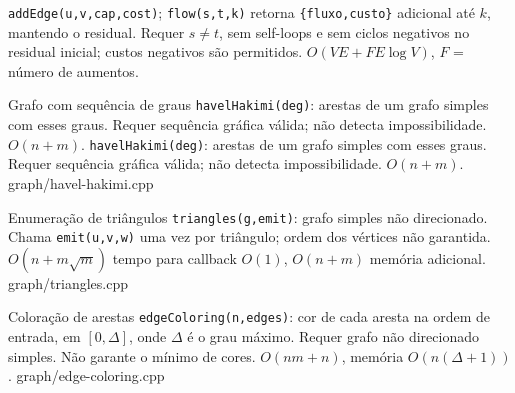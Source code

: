 {\texttt{addEdge(u,v,cap,cost)}; \texttt{flow(s,t,k)} retorna \texttt{\{fluxo,custo\}} adicional até $k$, mantendo o residual. Requer $s\ne t$, sem self-loops e sem ciclos negativos no residual inicial; custos negativos são permitidos. $O(VE+FE\log V)$, $F$ = número de aumentos.}
{}

\ifextended

\templateentry
{Grafo com sequência de graus}
{\texttt{havelHakimi(deg)}: arestas de um grafo simples com esses graus. Requer sequência gráfica válida; não detecta impossibilidade. $O(n+m)$.}
{\texttt{havelHakimi(deg)}: arestas de um grafo simples com esses graus. Requer sequência gráfica válida; não detecta impossibilidade. $O(n+m)$.}
{graph/havel-hakimi.cpp}

\templateentry
{Enumeração de triângulos}
{}
{\texttt{triangles(g,emit)}: grafo simples não direcionado. Chama \texttt{emit(u,v,w)} uma vez por triângulo; ordem dos vértices não garantida. $O(n+m\sqrt m)$ tempo para callback $O(1)$, $O(n+m)$ memória adicional.}
{graph/triangles.cpp}

\templateentry
{Coloração de arestas}
{}
{\texttt{edgeColoring(n,edges)}: cor de cada aresta na ordem de entrada, em $[0,\Delta]$, onde $\Delta$ é o grau máximo. Requer grafo não direcionado simples. Não garante o mínimo de cores. $O(nm+n)$, memória $O(n(\Delta+1))$.}
{graph/edge-coloring.cpp}

\fi
